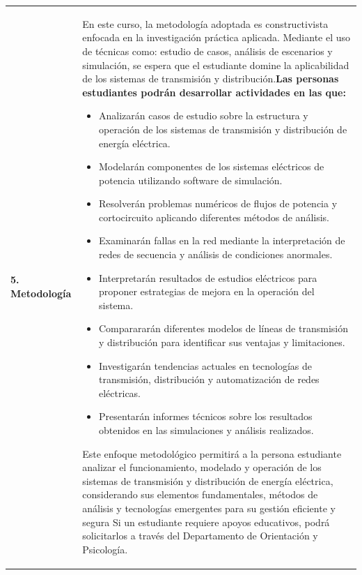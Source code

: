 \documentclass[letterpaper]{article}%
\begin{document}
\begin{tabularx}{\textwidth}{p{3cm}p{13cm}}%
\par\fontsize{12}{14}\selectfont \textbf{\textcolor{parte}{5. Metodología}}&En este curso, la metodología adoptada es constructivista enfocada en la investigación práctica aplicada. Mediante el uso de técnicas como:  estudio de casos, análisis de escenarios y simulación, se espera que el estudiante domine la aplicabilidad de los sistemas de transmisión y distribución.\newline\newline \textbf{Las personas estudiantes podrán desarrollar actividades en las que:} \newline\begin{itemize}\item Analizarán casos de estudio sobre la estructura y operación de los sistemas de transmisión y distribución de energía eléctrica.\item Modelarán componentes de los sistemas eléctricos de potencia utilizando software de simulación.\item Resolverán problemas numéricos de flujos de potencia y cortocircuito aplicando diferentes métodos de análisis.\item Examinarán fallas en la red mediante la interpretación de redes de secuencia y análisis de condiciones anormales.\item Interpretarán resultados de estudios eléctricos para proponer estrategias de mejora en la operación del sistema.\item Comparararán diferentes modelos de líneas de transmisión y distribución para identificar sus ventajas y limitaciones.\item Investigarán tendencias actuales en tecnologías de transmisión, distribución y automatización de redes eléctricas.\item Presentarán informes técnicos sobre los resultados obtenidos en las simulaciones y análisis realizados.\end{itemize}\vspace*{2mm}Este enfoque metodológico permitirá a la persona estudiante analizar el funcionamiento, modelado y operación de los sistemas de transmisión y distribución de energía eléctrica, considerando sus elementos fundamentales, métodos de análisis y tecnologías emergentes para su gestión eficiente y segura\vspace*{2mm} \newline  Si un estudiante requiere apoyos educativos, podrá solicitarlos a través del Departamento de Orientación y Psicología. \newline \\%
\end{tabularx}%
\end{document}
